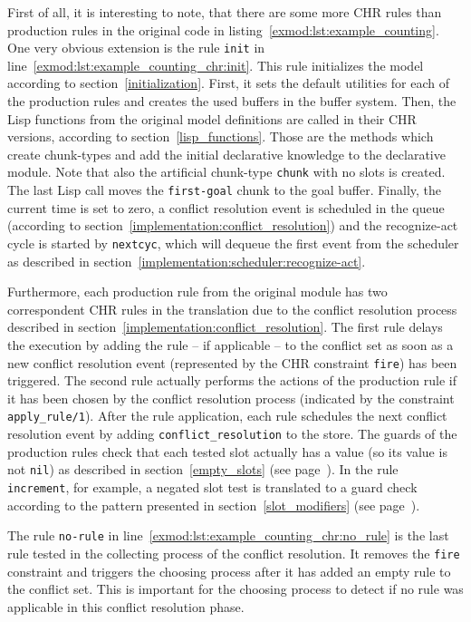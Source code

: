 First of all, it is interesting to note, that there are some more CHR rules than production rules in the original code in listing~\ref{exmod:lst:example_counting}. One very obvious extension is the rule \lstinline|init| in line~\ref{exmod:lst:example_counting_chr:init}. This rule initializes the model according to section~\ref{initialization}. First, it sets the default utilities for each of the production rules and creates the used buffers in the buffer system. Then, the Lisp functions from the original model definitions are called in their CHR versions, according to section~\ref{lisp_functions}. Those are the methods which create chunk-types and add the initial declarative knowledge to the declarative module. Note that also the artificial chunk-type \lstinline|chunk| with no slots is created. The last Lisp call moves the \lstinline|first-goal| chunk to the goal buffer. Finally, the current time is set to zero, a conflict resolution event is scheduled in the queue (according to section~\ref{implementation:conflict_resolution}) and the recognize-act cycle is started by \lstinline|nextcyc|, which will dequeue the first event from the scheduler as described in section~\ref{implementation:scheduler:recognize-act}.

Furthermore, each production rule from the original module has two correspondent CHR rules in the translation due to the conflict resolution process described in section~\ref{implementation:conflict_resolution}. The first rule delays the execution by adding the rule -- if applicable -- to the conflict set as soon as a new conflict resolution event (represented by the CHR constraint \lstinline|fire|) has been triggered. The second rule actually performs the actions of the production rule if it has been chosen by the conflict resolution process (indicated by the constraint \lstinline|apply_rule/1|). After the rule application, each rule schedules the next conflict resolution event by adding \lstinline|conflict_resolution| to the store. The guards of the production rules check that each tested slot actually has a value (so its value is not \lstinline|nil|) as described in section~\ref{empty_slots} (see page~\pageref{empty_slots}). In the rule \lstinline|increment|, for example, a negated slot test is translated to a guard check according to the pattern presented in section~\ref{slot_modifiers} (see page~\pageref{slot_modifiers}).

The rule \lstinline|no-rule| in line~\ref{exmod:lst:example_counting_chr:no_rule} is the last rule tested in the collecting process of the conflict resolution. It removes the \lstinline|fire| constraint and triggers the choosing process after it has added an empty rule to the conflict set. This is important for the choosing process to detect if no rule was applicable in this conflict resolution phase.

